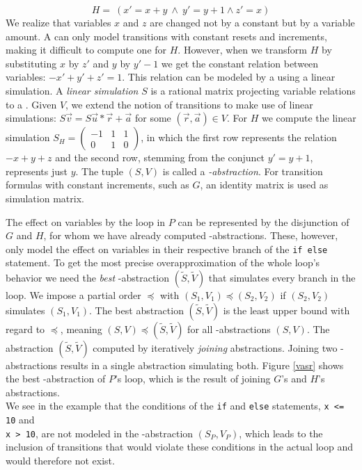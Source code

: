 \begin{equation*}
	H= \ (x' = x + y\ \land\ y' = y + 1 \land z' = x)
\end{equation*} We realize that variables $x$ and $z$ are changed not by a constant but by a variable amount. A \qvasr can only model transitions with constant resets and increments, making it difficult to compute one for $H$. However, when we transform $H$ by substituting $x$ by $z'$ and $y$ by $y'- 1$ we get the constant relation between variables: $-x' + y' + z' = 1$. This relation can be modeled by a \qvasr using a linear simulation. A \textsl{linear simulation} $S$ is a rational matrix projecting variable relations to a \qvasr. Given \qvasr $V$, we extend the notion of transitions to make use of linear simulations: $S\vec{v} = S\vec{u} * \vec{r} + \vec{a}$ for some $(\vec{r}, \vec{a}) \in V$. For $H$ we compute the linear simulation $S_H = \begin{pmatrix}
	-1 & 1 & 1 \\
	0 & 1 & 0
\end{pmatrix}$, in which the first row represents the relation $-x + y + z$ and the second row, stemming from the conjunct $y' = y + 1$, represents just $y$. The tuple $(S, V)$ is called a \textsl{\qvasr-abstraction}. For transition formulas with constant increments, such as $G$, an identity matrix is used as simulation matrix. \par
The effect on variables by the loop in $P$ can be represented by the disjunction of $G$ and $H$, for whom we have already computed \qvasr-abstractions. These, however, only model the effect on variables in their respective branch of the \texttt{if else} statement. To get the most precise overapproximation of the whole loop's behavior we need the \textsl{best} \qvasr-abstraction $(\tilde{S}, \tilde{V})$ that simulates every branch in the loop.
We impose a partial order $\preceq$ with $(S_1, V_1) \preceq (S_2, V_2)$ if $(S_2, V_2)$ simulates $(S_1, V_1)$. The best abstraction $(\tilde{S}, \tilde{V})$ is the least upper bound with regard to $\preceq$, meaning $(S, V) \preceq (\tilde{S}, \tilde{V})$ for all \qvasr-abstractions $(S, V)$. The abstraction $(\tilde{S}, \tilde{V})$ computed by iteratively \textsl{joining} abstractions. Joining two \qvasr-abstractions results in a single abstraction simulating both. Figure \ref{vasr} shows the best \qvasr-abstraction of $P$'s loop, which is the result of joining $G$'s and $H$'s abstractions. \\

We see in the example that the conditions of the \texttt{if} and \texttt{else} statements, \texttt{x <= 10} and \\ \texttt{x > 10}, are not modeled in the \qvasr-abstraction $(S_P, V_P)$, which leads to the inclusion of transitions that would violate these conditions in the actual loop and would therefore not exist. \\

